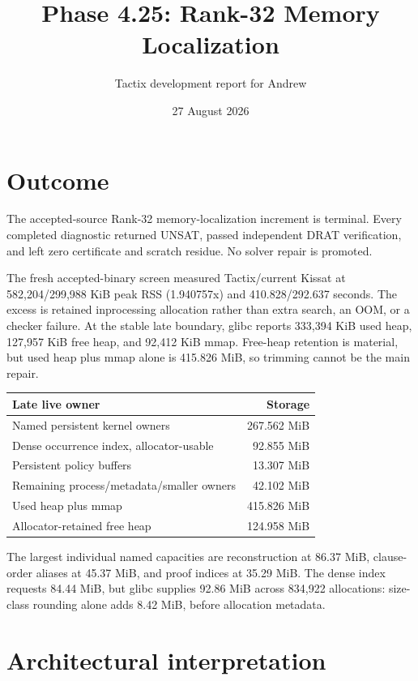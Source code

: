 \documentclass[11pt]{article}
\title{Phase 4.25: Rank-32 Memory Localization}
\author{Tactix development report for Andrew}
\date{27 August 2026}
\begin{document}
\maketitle

\section{Outcome}

The accepted-source Rank-32 memory-localization increment is terminal.  Every
completed diagnostic returned UNSAT, passed independent DRAT verification, and
left zero certificate and scratch residue.  No solver repair is promoted.

The fresh accepted-binary screen measured Tactix/current Kissat at
582,204/299,988 KiB peak RSS (1.940757x) and 410.828/292.637 seconds.  The
excess is retained inprocessing allocation rather than extra search, an OOM,
or a checker failure.  At the stable late boundary, glibc reports 333,394 KiB
used heap, 127,957 KiB free heap, and 92,412 KiB mmap.  Free-heap retention is
material, but used heap plus mmap alone is 415.826 MiB, so trimming cannot be
the main repair.

\begin{center}
\begin{tabular}{lr}
\toprule
Late live owner & Storage \\
\midrule
Named persistent kernel owners & 267.562 MiB \\
Dense occurrence index, allocator-usable & 92.855 MiB \\
Persistent policy buffers & 13.307 MiB \\
Remaining process/metadata/smaller owners & 42.102 MiB \\
\midrule
Used heap plus mmap & 415.826 MiB \\
Allocator-retained free heap & 124.958 MiB \\
\bottomrule
\end{tabular}
\end{center}

The largest individual named capacities are reconstruction at 86.37 MiB,
clause-order aliases at 45.37 MiB, and proof indices at 35.29 MiB.  The dense
index requests 84.44 MiB, but glibc supplies 92.86 MiB across 834,922
allocations: size-class rounding alone adds 8.42 MiB, before allocation
metadata.

\section{Architectural interpretation}
\end{document}

